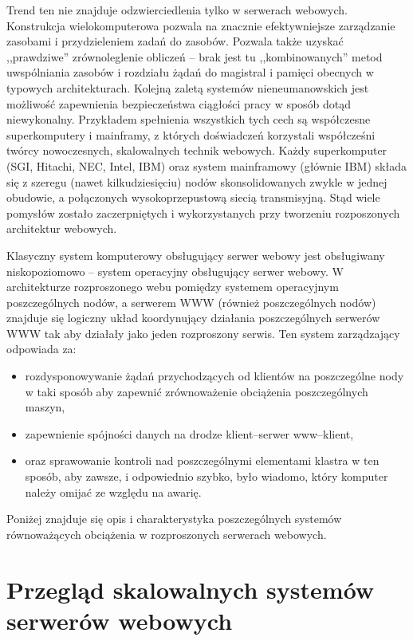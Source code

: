 Trend ten nie znajduje odzwierciedlenia tylko w serwerach webowych. Konstrukcja wielokomputerowa pozwala na znacznie 
efektywniejsze zarządzanie zasobami i przydzieleniem zadań do zasobów. Pozwala także uzyskać ,,prawdziwe'' zrównoleglenie
obliczeń -- brak jest tu ,,kombinowanych'' metod uwspólniania zasobów i rozdziału żądań do magistral i pamięci obecnych
w typowych architekturach. Kolejną zaletą systemów nieneumanowskich jest możliwość zapewnienia bezpieczeństwa ciągłości
pracy w sposób dotąd niewykonalny. Przykładem spełnienia wszystkich tych cech są współczesne superkomputery i mainframy, 
z których doświadczeń korzystali współcześni twórcy nowoczesnych, skalowalnych technik webowych. Każdy superkomputer (SGI,
Hitachi, NEC, Intel, IBM) oraz system mainframowy (głównie IBM) składa się z szeregu (nawet kilkudziesięciu) nodów 
skonsolidowanych zwykle w jednej obudowie, a połączonych wysokoprzepustową siecią transmisyjną. Stąd wiele pomysłów zostało
zaczerpniętych i wykorzystanych przy tworzeniu rozposzonych architektur webowych.

Klasyczny system komputerowy obsługujący serwer webowy jest obsługiwany niskopoziomowo -- system operacyjny obsługujący
serwer webowy. W architekturze rozproszonego webu pomiędzy systemem operacyjnym poszczególnych nodów, a serwerem WWW (również
poszczególnych nodów) znajduje się logiczny układ koordynujący działania poszczególnych serwerów WWW tak aby działały jako
jeden rozproszony serwis. Ten system zarządzający odpowiada za: 
\begin{itemize}
\item rozdysponowywanie żądań przychodzących od klientów na poszczególne nody w taki sposób aby zapewnić zrównoważenie 
obciążenia poszczególnych maszyn, 
\item zapewnienie spójności danych na drodze klient--serwer www--klient, 
\item oraz sprawowanie kontroli nad poszczególnymi elementami klastra w ten sposób, aby zawsze, i odpowiednio szybko, było 
wiadomo, który komputer należy omijać ze względu na awarię.
\end{itemize}

Poniżej znajduje się opis i charakterystyka poszczególnych systemów równoważących obciążenia w rozproszonych serwerach 
webowych. 

\section{Przegląd skalowalnych systemów serwerów webowych}

